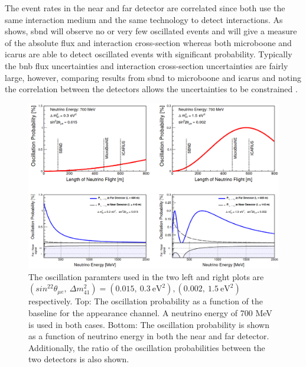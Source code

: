 The event rates in the near and far detector are correlated since both use the same interaction medium and the same technology to detect interactions. As  shows, \gls{sbnd} will observe no or very few oscillated events and will give a measure of the absolute flux and interaction cross-section whereas both \gls{microboone} and \gls{icarus} are able to detect oscillated events with significant probability. Typically the \gls{bnb} flux uncertainties and interaction cross-section uncertainties are fairly large, however, comparing results from \gls{sbnd} to \gls{microboone} and \gls{icarus} and noting the correlation between the detectors allows the uncertainties to be constrained \cite{SBN_paper}. 

\begin{figure}[!h]
    \centering
    \includegraphics[width = \largefigwidth]{figures-chap3/osc_probability.png}
    \caption[SBN oscillation probability.]{The oscillation paramters used in the two left and right plots are $(sin^22\theta_{\mu e}, ~\Delta m^2_{41}) = (0.015, ~0.3~\text{eV}^2), (0.002, ~1.5~\text{eV}^2)$ respectively. Top: The oscillation probability as a function of the baseline for the \nue appearance channel. A neutrino energy of 700 MeV is used in both cases. Bottom: The oscillation probability is shown as a function of neutrino energy in both the near and far detector. Additionally, the ratio of the oscillation probabilities between the two detectors is also shown. \cite{SBN_paper}}
    \label{fig:osc_probability}
\end{figure}


